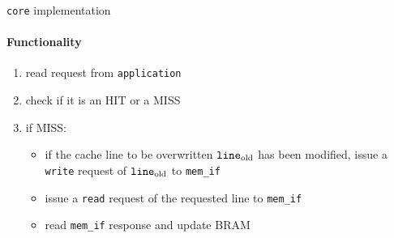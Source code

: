 \documentclass{beamer}
\begin{document}
\begin{frame}{\texttt{core} implementation}
	\framesubtitle{Functionality}
	\begin{minipage}{.7\textwidth}
		\begin{enumerate}[<+->]
			\item read request from \texttt{application}
			\item check if it is an HIT or a MISS
			\item if MISS: 
				\begin{itemize}
					\item if the cache line to be overwritten $\text{\texttt{line}}_{\text{old}}$
						has been modified, issue a \texttt{write}
						request of $\text{\texttt{line}}_{\text{old}}$ to \texttt{mem\_if}
					\item issue a \texttt{read} request of the
						requested line to \texttt{mem\_if}
					\item read \texttt{mem\_if} response and
						update BRAM


\end{itemize}
\end{enumerate}
\end{minipage}
\end{frame}
\end{document}
